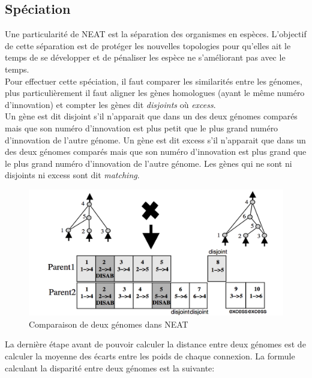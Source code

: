 \documentclass{article}
\begin{document}
\subsection{Spéciation}

Une particularité de NEAT est la séparation des organismes en espèces. L'objectif de cette séparation est de protéger les nouvelles topologies pour qu'elles ait le temps de se développer et de pénaliser les espèce ne s'améliorant pas avec le temps.\\ 

Pour effectuer cette spéciation, il faut comparer les similarités entre les génomes, plus particulièrement il faut aligner les gènes homologues (ayant le même numéro d'innovation) et compter les gènes dit \textit{disjoints} où \textit{excess}.\\
Un gène est dit disjoint s'il n'apparait que dans un des deux génomes comparés mais que son numéro d'innovation est plus petit que le plus grand numéro d'innovation de l'autre génome. Un gène est dit excess s'il n'apparait que dans un des deux génomes comparés mais que son numéro d'innovation est plus grand que le plus grand numéro d'innovation de l'autre génome. Les gènes qui ne sont ni disjoints ni excess sont dit \textit{matching}.

\begin{figure}[H]
\begin{center}
	\includegraphics[scale=0.4]{disjointexcess.png}
	\caption{Comparaison de deux génomes dans NEAT\cite{neatpaper}}
\end{center}
\end{figure}

La dernière étape avant de pouvoir calculer la distance entre deux génomes est de calculer la moyenne des écarts entre les poids de chaque connexion.
La formule calculant la disparité entre deux génomes est la suivante:
\end{document}
